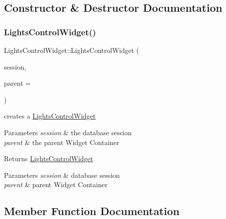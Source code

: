 \subsection{Constructor \& Destructor Documentation}
\mbox{\label{class_lights_control_widget_a15e1439f70466b481134b8eba8f3cd5d}} 
\subsubsection{\texorpdfstring{Lights\+Control\+Widget()}{LightsControlWidget()}}
{\footnotesize\ttfamily Lights\+Control\+Widget\+::\+Lights\+Control\+Widget (\begin{DoxyParamCaption}\item[{\hyperlink{class_session}{Session} $\ast$}]{session,  }\item[{Wt\+::\+W\+Container\+Widget $\ast$}]{parent = {} }\end{DoxyParamCaption})}



creates a \hyperlink{class_lights_control_widget}{Lights\+Control\+Widget} 


\begin{DoxyParams}{Parameters}
{\em session} & the database session \\
\hline
{\em parent} & the parent Widget Container \\
\hline
\end{DoxyParams}
\begin{DoxyReturn}{Returns}
\hyperlink{class_lights_control_widget}{Lights\+Control\+Widget} 
\end{DoxyReturn}

\begin{DoxyParams}{Parameters}
{\em session} & database session \\
\hline
{\em parent} & parent Widget Container \\
\hline
\end{DoxyParams}


\subsection{Member Function Documentation}
\mbox{\label{class_lights_control_widget_a05224e6a3f891fb29bbf85548aad4684}} 
